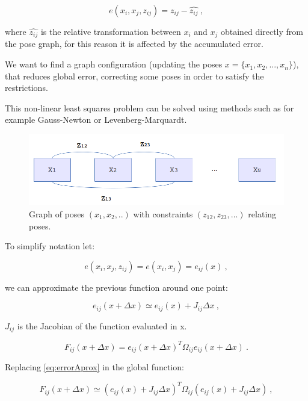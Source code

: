 $$
e(x_i,x_j,z_{ij}) = z_{ij} - \hat{z_{ij}} \ ,
$$

\noindent where $\hat{z_{ij}}$ is the relative transformation between $x_i$ and $x_j$ obtained directly from the pose graph, for this reason 
it is affected by the accumulated error.

We want to find a graph configuration (updating the poses $x=\{x_1,x_2,...,x_n\}$), that reduces global error,
 correcting some poses in order to satisfy the restrictions.

This  non-linear least squares problem can be solved using 
methods such as for example Gauss-Newton or Levenberg-Marquardt.

\begin{figure}[!h]
\begin{center}
\includegraphics[scale=1.5]{images/graph_diagram2}
\caption{Graph of poses $(x_1,x_2,..)$ with constraints $(z_{12},z_{23},...)$ relating poses.}
\end{center}
\end{figure}

To simplify notation let: 

$$
e(x_i,x_j,z_{ij}) = e(x_i,x_j) = e_{ij}(x) \ ,
$$

\noindent we can approximate the previous function around one point:

\begin{equation}
\label{eq:errorAprox}
e_{ij}(x + \Delta x) \simeq e_{ij}(x) + J_{ij} \Delta x \ ,
\end{equation}

\noindent $J_{ij}$ is the Jacobian of the function evaluated in x. 


\begin{equation}
\label{eq:globalFunc}
F_{ij}(x + \Delta x) = e_{ij}(x + \Delta x)^T \Omega_{ij}  e_{ij}(x + \Delta x) \ .
\end{equation}

\noindent Replacing \ref{eq:errorAprox} in the global function:

\begin{equation}
\label{eq:globalFuncAprox}
F_{ij}(x + \Delta x) \simeq (e_{ij}(x) + J_{ij} \Delta x)^T \Omega_{ij}  (e_{ij}(x) + J_{ij} \Delta x) \ ,
\end{equation}

